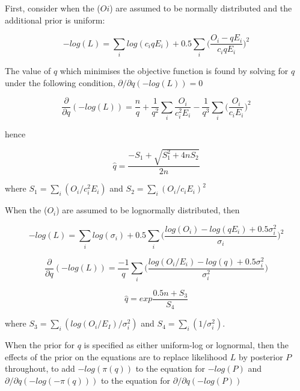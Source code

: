 First, consider when the ($Oi$) are assumed to be normally distributed and the additional prior is uniform:

\begin{equation}\label{EQ:1}
	-log(L) = \sum_i log (c_iqE_i) + 0.5\sum_i \bigg(\frac{O_i - qE_i}{c_iqE_i} \bigg)^2
\end{equation}

The value of $q$ which minimises the objective function is found by solving for $q$ under the following condition, $\partial/\partial q(-log(L)) = 0$

\begin{equation}\label{EQ:2}
	\frac{\partial }{\partial q}(-log(L)) = \frac{n}{q} + \frac{1}{q^2} \sum_i \frac{O_i}{c_i^2E_i} - \frac{1}{q^3} \sum_i \bigg(\frac{O_i}{c_iE_i}\bigg)^2
\end{equation}

hence

\begin{equation}\label{EQ:3}
	\hat q = \frac{-S_1 + \sqrt{S_1^2 + 4nS_2}}{2n}
\end{equation}

where $S_1 = \sum_i (O_i/c_i^2E_i)$ and $S_2 = \sum_i (O_i/c_iE_i)^2$

When the ($O_i$) are assumed to be lognormally distributed, then

\begin{equation}\label{EQ:4}
	-log(L) = \sum_i log (\sigma_i) + 0.5\sum_i \bigg(\frac{log(O_i) - log(qE_i) + 0.5\sigma_i^2}{\sigma_i} \bigg)^2
\end{equation}

\begin{equation}\label{EQ:5}
	\frac{\partial }{\partial q}(-log(L)) = \frac{-1}{q} \sum_i\bigg( \frac{log(O_i/E_i) - log(q) + 0.5\sigma_i^2}{\sigma_i^2}\bigg)
\end{equation}

\begin{equation}\label{EQ:6}
	\hat q = exp\frac{0.5n + S_3}{S_4}
\end{equation}

where $S_3 = \sum_i (log(O_i /E_I)/\sigma_i^2)$ and $S_4 = \sum_i(1/\sigma_i^2)$.

When the prior for $q$ is specified as either uniform-log or lognormal, then the effects of the prior on the equations are to replace likelihood $L$ by posterior $P$ throughout, to add $-log(\pi(q))$ to the equation for $-log(P)$ and $\partial/\partial q(-log(-\pi(q)))$ to the equation for $\partial/\partial q(-log(P))$

